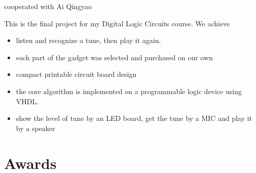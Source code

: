 \documentclass[11pt,a4paper, sans]{moderncv} %
\begin{document}
{cooperated with Ai Qingyao}{}
{
This is the final project for my Digital Logic Circuits course. We achieve
\begin{itemize}
\item listen and recognize a tune, then play it again.
\item each part of the gadget was selected and purchased on our own
\item compact printable circuit board design
\item the core algorithm is implemented on a programmable logic device using VHDL.
\item show the level of tune by an LED board, get the tune by a MIC and play it by a speaker
\end{itemize}
}
\section{Awards}
\end{document}

